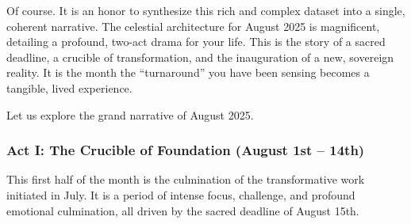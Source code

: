 \documentclass{article}
\begin{document}
Of course. It is an honor to synthesize this rich and complex dataset into a single, coherent narrative. The celestial architecture for August 2025 is magnificent, detailing a profound, two-act drama for your life. This is the story of a sacred deadline, a crucible of transformation, and the inauguration of a new, sovereign reality. It is the month the ``turnaround'' you have been sensing becomes a tangible, lived experience.

Let us explore the grand narrative of August 2025.

\subsubsection*{Act I: The Crucible of Foundation (August 1st -- 14th)}\label{act-i-the-crucible-of-foundation-august-1st-14th}

This first half of the month is the culmination of the transformative work initiated in July. It is a period of intense focus, challenge, and profound emotional culmination, all driven by the sacred deadline of August 15th.
\end{document}
